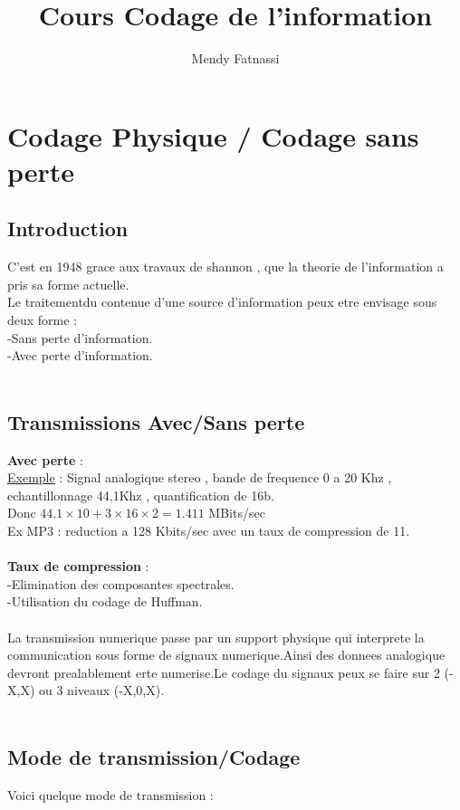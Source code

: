 \documentclass[a4paper,8pt,openany]{book}
\author{Mendy Fatnassi}
\title{Cours Codage de l'information}
\begin{document}
\maketitle
\tableofcontents

\chapter{Codage Physique / Codage sans perte}
\section{Introduction}

C'est en 1948 grace aux travaux de shannon , que la theorie de l'information a pris sa forme actuelle.\\
Le traitementdu contenue d'une source d'information peux etre envisage sous deux forme :\\
-Sans perte d'information.\\
-Avec perte d'information.\\
\\
\section{Transmissions Avec/Sans perte}
\textbf{Avec perte} : \\
\underline{Exemple} : Signal analogique stereo , bande de frequence 0 a 20 Khz , echantillonnage 44,1Khz , 
quantification de 16b.\\
Donc $44.1\times 10+3\times 16\times 2=1.411$ MBits/sec\\
Ex MP3 : reduction a 128 Kbits/sec avec un taux de compression de 11.\\
\\
\textbf{Taux de compression} : \\
-Elimination des composantes spectrales.\\
-Utilisation du codage de Huffman.\\
\\ 
La transmission numerique passe par un support physique qui interprete la communication sous forme de signaux numerique.Ainsi des donnees analogique devront prealablement erte numerise.Le codage du signaux peux se faire sur 2 (-X,X) ou 3 niveaux (-X,0,X).\\ 
\\

\section{Mode de transmission/Codage}
Voici quelque mode de transmission :\\
\\
\end{document}
